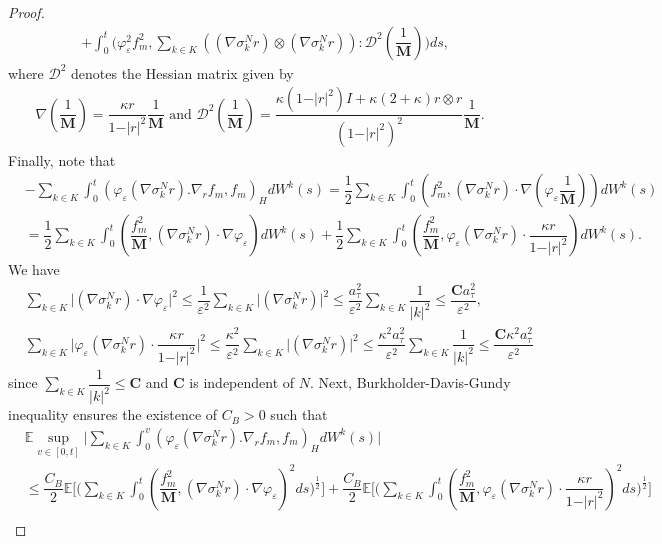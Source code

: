 \documentclass[10pt,a4paper]{amsart}
\newcommand{\E}{\ensuremath{\mathbb{E}}}
\begin{document}
\begin{proof}
\begin{align*}
    &+ \int_0^t\big(\varphi_\varepsilon^2 f_m^2, \sum_{k\in K} \left((\nabla \sigma_k^Nr) \otimes (\nabla \sigma_k^Nr)\right):\mathcal{D}^2(\dfrac{1}{\mathbf{M}})\big)ds,
\end{align*}
where $\mathcal{D}^2$ denotes the Hessian matrix given by 
\begin{align*}
    \nabla(\dfrac{1}{\mathbf{M}})=\dfrac{\kappa r}{1-\vert r\vert^2}\dfrac{1}{\mathbf{M}} \text{ and }  \mathcal{D}^2(\dfrac{1}{\mathbf{M}})=\dfrac{\kappa(1-\vert r\vert^2)I+\kappa(2+\kappa)r\otimes r}{(1-\vert r\vert^2)^2}\dfrac{1}{\mathbf{M}}.
\end{align*}
Finally, note that
\begin{align*}
   &- \sum_{k\in K}\int_0^t(\varphi_\varepsilon(\nabla \sigma_k^Nr).\nabla_rf_m ,f_m)_H dW^k(s)=\dfrac{1}{2}\sum_{k\in K}\int_0^t(f_m^2 ,(\nabla \sigma_k^Nr)\cdot\nabla(\varphi_\varepsilon \dfrac{1}{\mathbf{M}})) dW^k(s)\\
   &=\dfrac{1}{2}\sum_{k\in K}\int_0^t(\dfrac{f_m^2}{\mathbf{M}} ,(\nabla \sigma_k^Nr)\cdot\nabla\varphi_\varepsilon) dW^k(s)+\dfrac{1}{2}\sum_{k\in K}\int_0^t(\dfrac{f_m^2}{\mathbf{M}}, \varphi_\varepsilon(\nabla \sigma_k^Nr)\cdot \dfrac{\kappa r}{1-\vert r\vert^2} ) dW^k(s).
\end{align*}
We have
\begin{align*}
    & \sum_{k\in K} \vert(\nabla \sigma_k^Nr)\cdot\nabla\varphi_\varepsilon\vert^2 \leq \dfrac{1}{\varepsilon^2} \sum_{k\in K}\vert (\nabla \sigma_k^Nr)\vert^2
     \leq \dfrac{a_\tau^2}{\varepsilon^2} \sum_{k\in K} \dfrac{1}{\vert k\vert^2}\leq  \dfrac{ \mathbf{C}a_\tau^2}{\varepsilon^2}, \\
     & \sum_{k\in K} \vert\varphi_\varepsilon(\nabla \sigma_k^Nr)\cdot \dfrac{\kappa r}{1-\vert r\vert^2}\vert^2 \leq \dfrac{\kappa^2}{\varepsilon^2} \sum_{k\in K}\vert (\nabla \sigma_k^Nr)\vert^2
     \leq \dfrac{\kappa^2 a_\tau^2}{\varepsilon^2} \sum_{k\in K} \dfrac{1}{\vert k\vert^2}\leq  \dfrac{\mathbf{C}\kappa^2 a_\tau^2}{\varepsilon^2}
\end{align*}
since $\sum_{k\in K} \dfrac{1}{\vert k\vert^2}\leq \mathbf{C}$ and $\mathbf{C}$ is independent of $N$. Next, Burkholder-Davis-Gundy inequality ensures the existence of $C_B>0$ such that 
\begin{align*}
  &\E \sup_{v\in[0,t]}   \vert \sum_{k\in K}\int_0^v(\varphi_\varepsilon(\nabla \sigma_k^Nr).\nabla_rf_m ,f_m)_H dW^k(s)\vert \\
  &\leq  \dfrac{C_B}{2}\E\Big[\big(\sum_{k\in K}\int_0^t(\dfrac{f_m^2}{\mathbf{M}} ,(\nabla \sigma_k^Nr)\cdot\nabla\varphi_\varepsilon)^2 ds\big)^{\frac{1}{2}} \Big]+\dfrac{C_B}{2}\E\Big[(\sum_{k\in K}\int_0^t(\dfrac{f_m^2}{\mathbf{M}}, \varphi_\varepsilon(\nabla \sigma_k^Nr)\cdot \dfrac{\kappa r}{1-\vert r\vert^2} )^2 ds\big)^{\frac{1}{2}} \Big]\\

\end{align*}
\end{proof}
\end{document}
